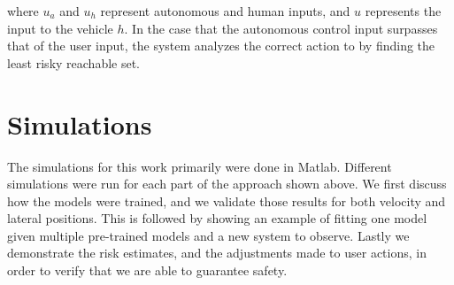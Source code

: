 \documentclass[letterpaper, 10 pt, conference]{ieeeconf}  %
\newcommand\RP[1]{$\clubsuit$\footnote{RP: #1}}
\begin{document}
where $u_a$ and $u_h$ represent autonomous and human inputs, and $u$ represents the input to the vehicle $h$. In the case that the autonomous control input surpasses that of the user input, the system analyzes the correct action to by finding the least risky reachable set.





\section{Simulations} \label{sec:sims}
The simulations for this work primarily were done in Matlab. Different simulations were run for each part of the approach shown above. We first discuss how the models were trained, and we validate those results for both velocity and lateral positions. This is followed by showing an example of fitting one model given multiple pre-trained models and a new system to observe. Lastly we demonstrate the risk estimates, and the adjustments made to user actions, in order to verify that we are able to guarantee safety.
\end{document}
